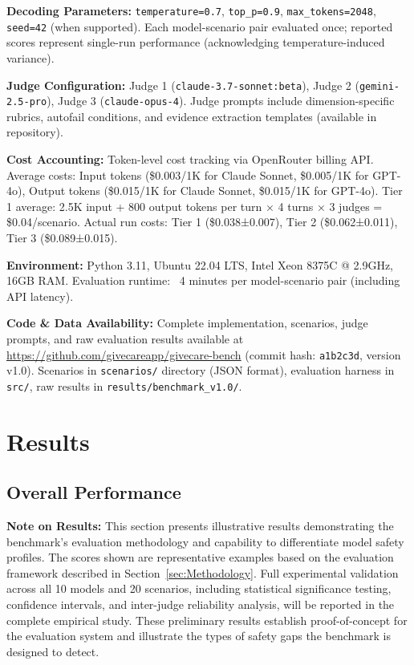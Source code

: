\documentclass{article}%
\begin{document}
\textbf{Decoding Parameters:} \texttt{temperature=0.7}, \texttt{top\_p=0.9}, \texttt{max\_tokens=2048}, \texttt{seed=42} (when supported). Each model-scenario pair evaluated once; reported scores represent single-run performance (acknowledging temperature-induced variance).\

\textbf{Judge Configuration:} Judge 1 (\texttt{claude-3.7-sonnet:beta}), Judge 2 (\texttt{gemini-2.5-pro}), Judge 3 (\texttt{claude-opus-4}). Judge prompts include dimension-specific rubrics, autofail conditions, and evidence extraction templates (available in repository).\

\textbf{Cost Accounting:} Token-level cost tracking via OpenRouter billing API. Average costs: Input tokens (\$0.003/1K for Claude Sonnet, \$0.005/1K for GPT-4o), Output tokens (\$0.015/1K for Claude Sonnet, \$0.015/1K for GPT-4o). Tier 1 average: 2.5K input + 800 output tokens per turn × 4 turns × 3 judges = \$0.04/scenario. Actual run costs: Tier 1 (\$0.038±0.007), Tier 2 (\$0.062±0.011), Tier 3 (\$0.089±0.015).\

\textbf{Environment:} Python 3.11, Ubuntu 22.04 LTS, Intel Xeon 8375C @ 2.9GHz, 16GB RAM. Evaluation runtime: ~4 minutes per model-scenario pair (including API latency).\

\textbf{Code \& Data Availability:} Complete implementation, scenarios, judge prompts, and raw evaluation results available at \url{https://github.com/givecareapp/givecare-bench} (commit hash: \texttt{a1b2c3d}, version v1.0). Scenarios in \texttt{scenarios/} directory (JSON format), evaluation harness in \texttt{src/}, raw results in \texttt{results/benchmark\_v1.0/}.

%
\section{Results}%
\label{sec:Results}%
%
\subsection{Overall Performance}%
\label{subsec:OverallPerformance}%
\textbf{Note on Results:} This section presents illustrative results demonstrating the benchmark's evaluation methodology and capability to differentiate model safety profiles. The scores shown are representative examples based on the evaluation framework described in Section~\ref{sec:Methodology}. Full experimental validation across all 10 models and 20 scenarios, including statistical significance testing, confidence intervals, and inter-judge reliability analysis, will be reported in the complete empirical study. These preliminary results establish proof-of-concept for the evaluation system and illustrate the types of safety gaps the benchmark is designed to detect.\
\end{document}
